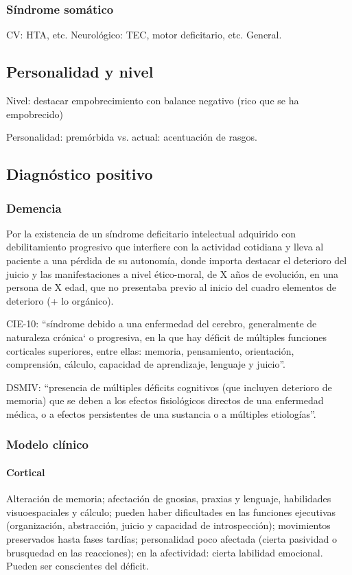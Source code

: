 \subsubsection*{Síndrome somático}
CV: HTA, etc. Neurológico: TEC, motor deficitario, etc. General.
\subsection*{Personalidad y nivel}
Nivel: destacar empobrecimiento con balance negativo (rico que se ha empobrecido)

Personalidad: premórbida vs. actual: acentuación de rasgos.

\subsection*{Diagnóstico positivo}
\subsubsection*{Demencia}
Por la existencia de un síndrome deficitario intelectual adquirido con debilitamiento progresivo que interfiere con la actividad cotidiana y lleva al paciente a una pérdida de su autonomía, donde importa destacar el deterioro del juicio y las manifestaciones a nivel ético-moral, de X años de evolución, en una persona de X edad, que no presentaba previo al inicio del cuadro elementos de deterioro (+ lo orgánico).

CIE-10: “síndrome debido a una enfermedad del cerebro, generalmente de naturaleza crónica` o progresiva, en la que hay déficit de múltiples funciones corticales superiores, entre ellas: memoria, pensamiento, orientación, comprensión, cálculo, capacidad de aprendizaje, lenguaje y juicio”.

DSMIV: “presencia de múltiples déficits cognitivos (que incluyen deterioro de memoria) que se deben a los efectos fisiológicos directos de una enfermedad médica, o a efectos persistentes de una sustancia o a múltiples etiologías”.
\subsubsection*{Modelo clínico}
\paragraph{Cortical} Alteración de memoria; afectación de gnosias, praxias y lenguaje, habilidades visuoespaciales y cálculo; pueden haber dificultades en las funciones ejecutivas (organización, abstracción, juicio y capacidad de introspección); movimientos preservados hasta fases tardías; personalidad poco afectada (cierta pasividad o brusquedad en las reacciones); en la afectividad: cierta labilidad emocional. Pueden ser conscientes del déficit.
